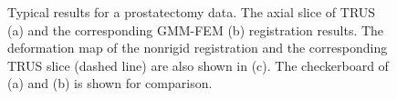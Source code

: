 \documentclass[journal]{IEEEtran}
\begin{document}
\begin{figure}
    \caption{Typical results for a prostatectomy data. The axial slice of TRUS (a) and the corresponding GMM-FEM (b) registration results. The deformation map of the nonrigid registration and the corresponding TRUS slice (dashed line) are also shown in (c). The checkerboard of (a) and (b) is shown for comparison. \label{fig:exp2fig2}}
\end{figure}
\end{document}
